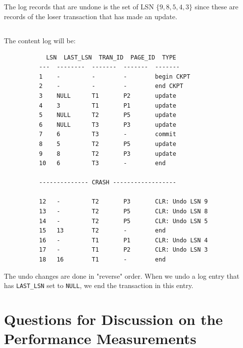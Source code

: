 \documentclass[a4paper]{article}
\begin{document}
\subsection{}
The log records that are undone is the set of LSN $\{9, 8, 5, 4, 3\}$ since these are records of the loser transaction that has made an update.

\subsection{}
The content log will be:
\begin{verbatim}
            LSN  LAST_LSN  TRAN_ID  PAGE_ID  TYPE
          ---  --------  -------  -------  -------
          1    -         -        -        begin CKPT
          2    -         -        -        end CKPT
          3    NULL      T1       P2       update
          4    3         T1       P1       update
          5    NULL      T2       P5       update
          6    NULL      T3       P3       update
          7    6         T3       -        commit
          8    5         T2       P5       update
          9    8         T2       P3       update
          10   6         T3       -        end

          -------------- CRASH ------------------

          12   -         T2       P3       CLR: Undo LSN 9
          13   -         T2       P5       CLR: Undo LSN 8
          14   -         T2       P5       CLR: Undo LSN 5
          15   13        T2       -        end
          16   -         T1       P1       CLR: Undo LSN 4
          17   -         T1       P2       CLR: Undo LSN 3
          18   16        T1       -        end
\end{verbatim}
The undo changes are done in "reverse" order. When we undo a log entry that has \texttt{LAST\_LSN} set to \texttt{NULL}, we end the transaction in this entry.

\section{Questions for Discussion on the Performance Measurements}
\end{document}
